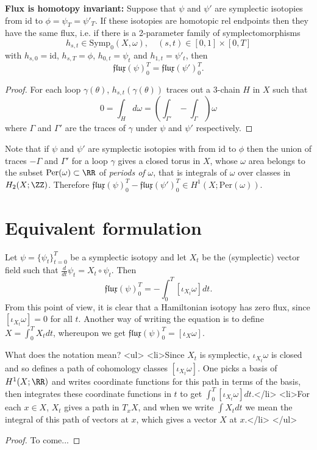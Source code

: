 \documentclass{article}
\begin{document}
\begin{Lemma}[lmafluxhtpy]
  {\bf Flux is homotopy invariant:} Suppose that $\psi$ and $\psi'$ are symplectic isotopies from $\mathrm{id}$ to $\phi=\psi_T=\psi'_T$. If these isotopies are homotopic rel endpoints then they have the same flux, i.e. if there is a 2-parameter family of symplectomorphisms
  \[h_{s,t}\in\mathrm{Symp}_0(X,\omega),\quad (s,t)\in[0,1]\times[0,T]\]
  with $h_{s,0}=\mathrm{id}$, $h_{s,T}=\phi$, $h_{0,t}=\psi_t$ and $h_{1,t}=\psi'_t$, then
  \[\mathfrak{flux}(\psi)_0^T=\mathfrak{flux}(\psi')_0^T.\]
\end{Lemma}
\begin{proof}
  For each loop $\gamma(\theta)$, $h_{s,t}(\gamma(\theta))$ traces out a 3-chain $H$ in $X$ such that
  \[0=\int_Hd\omega=\left(\int_{\Gamma'}-\int_{\Gamma}\right)\omega\]
  where $\Gamma$ and $\Gamma'$ are the traces of $\gamma$ under $\psi$ and $\psi'$ respectively.
\end{proof}

Note that if $\psi$ and $\psi'$ are symplectic isotopies with from $\mathrm{id}$ to $\phi$ then the union of traces $-\Gamma$ and $\Gamma'$ for a loop $\gamma$ gives a closed torus in $X$, whose $\omega$ area belongs to the subset $\mathrm{Per}(\omega)\subset\RR$ of {\em periods of $\omega$}, that is integrals of $\omega$ over classes in $H_2(X;\ZZ)$. Therefore $\mathfrak{flux}(\psi)_0^T-\mathfrak{flux}(\psi')_0^T\in H^1(X;\mathrm{Per}(\omega))$.

\section{Equivalent formulation}

\begin{Lemma}
  Let $\psi=\{\psi_t\}_{t=0}^T$ be a symplectic isotopy and let $X_t$ be the (symplectic) vector field such that $\frac{d}{dt}\psi_t=X_t\circ\psi_t$. Then
  \[\mathfrak{flux}(\psi)_0^T=-\int_0^T[\iota_{X_t}\omega]dt.\]
  From this point of view, it is clear that a Hamiltonian isotopy has zero flux, since $[\iota_{X_t}\omega]=0$ for all $t$. Another way of writing the equation is to define $X=\int_0^TX_tdt$, whereupon we get $\mathfrak{flux}(\psi)_0^T=[\iota_X\omega]$.
\end{Lemma}

What does the notation mean?
<ul>
<li>Since $X_t$ is symplectic, $\iota_{X_t}\omega$ is closed and so defines a path of cohomology classes $[\iota_{X_t}\omega]$. One picks a basis of $H^1(X;\RR)$ and writes coordinate functions for this path in terms of the basis, then integrates these coordinate functions in $t$ to get $\int_0^T[\iota_{X_t}\omega]dt$.</li>
<li>For each $x\in X$, $X_t$ gives a path in $T_xX$, and when we write $\int X_tdt$ we mean the integral of this path of vectors at $x$, which gives a vector $X$ at $x$.</li>
</ul>

\begin{proof}
  To come...
\end{proof}
\end{document}
